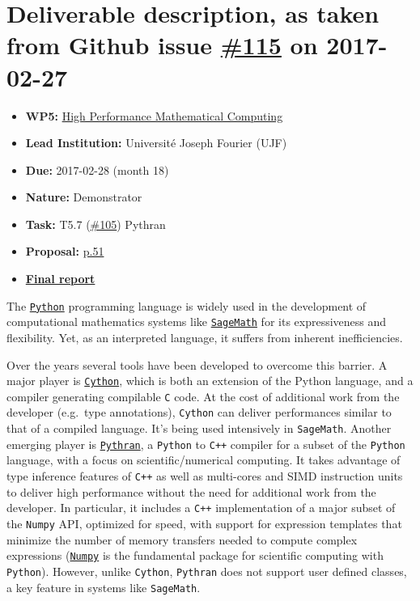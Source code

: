 \section*{\texorpdfstring{Deliverable description, as taken from Github
issue
\href{https://github.com/OpenDreamKit/OpenDreamKit/issues/115}{\#115} on
2017-02-27}{Deliverable description, as taken from Github issue \#115 on 2017-02-27}}\label{deliverable-description-as-taken-from-github-issue-115-on-2017-02-27}

\begin{itemize}
\tightlist
\item
  \textbf{WP5:}
  \href{https://github.com/OpenDreamKit/OpenDreamKit/tree/master/WP5}{High
  Performance Mathematical Computing}
\item
  \textbf{Lead Institution:} Université Joseph Fourier (UJF)
\item
  \textbf{Due:} 2017-02-28 (month 18)
\item
  \textbf{Nature:} Demonstrator
\item
  \textbf{Task:} T5.7
  (\href{https://github.com/OpenDreamKit/OpenDreamKit/issues/105}{\#105})
  Pythran
\item
  \textbf{Proposal:}
  \href{https://github.com/OpenDreamKit/OpenDreamKit/raw/master/Proposal/proposal-www.pdf}{p.51}
\item
  \textbf{\href{https://github.com/OpenDreamKit/OpenDreamKit/raw/master/WP5/D5.2/report-final.pdf}{Final
  report}}
\end{itemize}

The \href{http://python.org}{\texttt{Python}} programming language is
widely used in the development of computational mathematics systems like
\href{http://sagemath.org}{\texttt{SageMath}} for its expressiveness and
flexibility. Yet, as an interpreted language, it suffers from inherent
inefficiencies.

Over the years several tools have been developed to overcome this
barrier. A major player is \href{http://cython.org}{\texttt{Cython}},
which is both an extension of the Python language, and a compiler
generating compilable \texttt{C} code. At the cost of additional work
from the developer (e.g.~type annotations), \texttt{Cython} can deliver
performances similar to that of a compiled language. It's being used
intensively in \texttt{SageMath}. Another emerging player is
\href{https://pythonhosted.org/pythran/}{\texttt{Pythran}}, a
\texttt{Python} to \texttt{C++} compiler for a subset of the
\texttt{Python} language, with a focus on scientific/numerical
computing. It takes advantage of type inference features of \texttt{C++}
as well as multi-cores and SIMD instruction units to deliver high
performance without the need for additional work from the developer. In
particular, it includes a \texttt{C++} implementation of a major subset
of the \texttt{Numpy} API, optimized for speed, with support for
expression templates that minimize the number of memory transfers needed
to compute complex expressions (\href{http://numpy.org}{\texttt{Numpy}}
is the fundamental package for scientific computing with
\texttt{Python}). However, unlike \texttt{Cython}, \texttt{Pythran} does
not support user defined classes, a key feature in systems like
\texttt{SageMath}.

